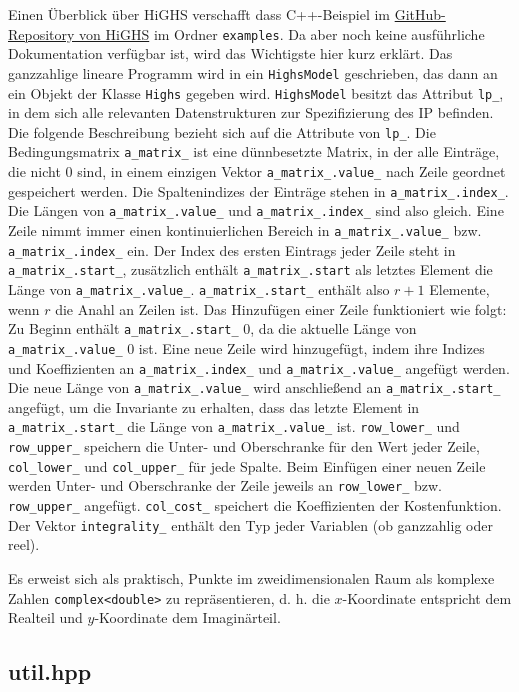 \documentclass[a4paper, 10pt, ngerman]{article}
\begin{document}
Einen Überblick über HiGHS verschafft dass C++-Beispiel im \href{https://github.com/ERGO-Code/HiGHS}{GitHub-Repository von HiGHS} im Ordner \verb|examples|. Da aber noch keine ausführliche Dokumentation verfügbar ist, wird das Wichtigste hier kurz erklärt. Das ganzzahlige lineare Programm wird in ein \verb|HighsModel| geschrieben, das dann an ein Objekt der Klasse \verb|Highs| gegeben wird. \verb|HighsModel| besitzt das Attribut \verb|lp_|, in dem sich alle relevanten Datenstrukturen zur Spezifizierung des IP befinden. Die folgende Beschreibung bezieht sich auf die Attribute von \verb|lp_|. Die Bedingungsmatrix \verb|a_matrix_| ist eine dünnbesetzte Matrix, in der alle Einträge, die nicht 0 sind, in einem einzigen Vektor \verb|a_matrix_.value_| nach Zeile geordnet gespeichert werden. Die Spaltenindizes der Einträge stehen in \verb|a_matrix_.index_|. Die Längen von \verb|a_matrix_.value_| und \verb|a_matrix_.index_| sind also gleich. Eine Zeile nimmt immer einen kontinuierlichen Bereich in \verb|a_matrix_.value_| bzw. \verb|a_matrix_.index_| ein. Der Index des ersten Eintrags jeder Zeile steht in \verb|a_matrix_.start_|, zusätzlich enthält \verb|a_matrix_.start| als letztes Element die Länge von \verb|a_matrix_.value_|. \verb|a_matrix_.start_| enthält also $r + 1$ Elemente, wenn $r$ die Anahl an Zeilen ist. Das Hinzufügen einer Zeile funktioniert wie folgt: Zu Beginn enthält \verb|a_matrix_.start_| 0, da die aktuelle Länge von \verb|a_matrix_.value_| 0 ist. Eine neue Zeile wird hinzugefügt, indem ihre Indizes und Koeffizienten an \verb|a_matrix_.index_| und \verb|a_matrix_.value_| angefügt werden. Die neue Länge von \verb|a_matrix_.value_| wird anschließend an \verb|a_matrix_.start_| angefügt, um die Invariante zu erhalten, dass das letzte Element in \verb|a_matrix_.start_| die Länge von \verb|a_matrix_.value_| ist. \verb|row_lower_| und \verb|row_upper_| speichern die Unter- und Oberschranke für den Wert jeder Zeile, \verb|col_lower_| und \verb|col_upper_| für jede Spalte. Beim Einfügen einer neuen Zeile werden Unter- und Oberschranke der Zeile jeweils an \verb|row_lower_| bzw. \verb|row_upper_| angefügt. \verb|col_cost_| speichert die Koeffizienten der Kostenfunktion. Der Vektor \verb|integrality_| enthält den Typ jeder Variablen (ob ganzzahlig oder reel).

Es erweist sich als praktisch, Punkte im zweidimensionalen Raum als komplexe Zahlen \verb|complex<double>| zu repräsentieren, d. h. die $x$-Koordinate entspricht dem Realteil und $y$-Koordinate dem Imaginärteil. 

\subsection{util.hpp}
\end{document}
